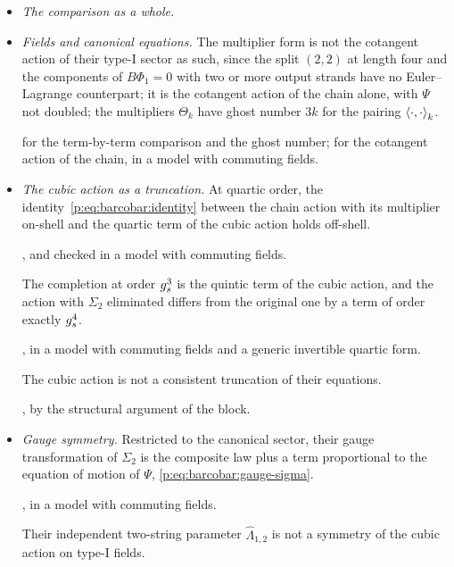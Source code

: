 \begin{itemize}
  \setlength{\itemsep}{1ex}

  \item \emph{The comparison as a whole.}


  \item \emph{Fields and canonical equations.} The multiplier form is not the cotangent action of their type-I sector as such, since the split $(2, 2)$ at length four and the components of $B \Phi_1 = 0$ with two or more output strands have no Euler--Lagrange counterpart; it is the cotangent action of the chain alone, with $\Psi$ not doubled; the multipliers $\Theta_k$ have ghost number $3 k$ for the pairing $\pair[k]{\cdot}{\cdot}$.

     for the term-by-term comparison and the ghost number;  for the cotangent action of the chain, in a model with commuting fields.

  \item \emph{The cubic action as a truncation.} At quartic order, the identity~\eqref{p:eq:barcobar:identity} between the chain action with its multiplier on-shell and the quartic term of the cubic action holds off-shell.

    , and checked in a model with commuting fields.

    The completion at order $\gs^3$ is the quintic term of the cubic action, and the action with $\Sigma_2$ eliminated differs from the original one by a term of order exactly $\gs^4$.

    , in a model with commuting fields and a generic invertible quartic form.

    The cubic action is not a consistent truncation of their equations.

    , by the structural argument of the block.

  \item \emph{Gauge symmetry.} Restricted to the canonical sector, their gauge transformation of $\Sigma_2$ is the composite law plus a term proportional to the equation of motion of $\Psi$, \eqref{p:eq:barcobar:gauge-sigma}.

    , in a model with commuting fields.

    Their independent two-string parameter $\hat\Lambda_{1, 2}$ is not a symmetry of the cubic action on type-I fields.


\end{itemize}
